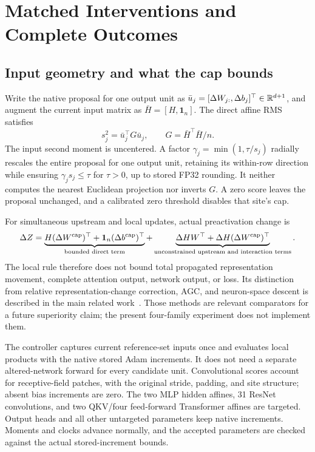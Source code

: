 \clearpage
\section{Matched Interventions and Complete Outcomes}

\subsection{Input geometry and what the cap bounds}
Write the native proposal for one output unit as $\bar u_j=[\Delta W_{j:},\Delta b_j]^\top\in\mathbb{R}^{d+1}$, and augment the current input matrix as $\bar H=[H,\mathbf1_n]$. The direct affine RMS satisfies
\begin{equation}
 s_j^2=\bar u_j^\top G\bar u_j,\qquad G=\bar H^\top\bar H/n.
\end{equation}
The input second moment is uncentered. A factor $\gamma_j=\min(1,\tau/s_j)$ radially rescales the entire proposal for one output unit, retaining its within-row direction while ensuring $\gamma_js_j\leq\tau$ for $\tau>0$, up to stored FP32 rounding. It neither computes the nearest Euclidean projection nor inverts $G$. A zero score leaves the proposal unchanged, and a calibrated zero threshold disables that site's cap.

For simultaneous upstream and local updates, actual preactivation change is
\begin{equation}
 \Delta Z=
 \underbrace{H(\Delta W^{\rm cap})^\top+\mathbf1_n(\Delta b^{\rm cap})^\top}_{\text{bounded direct term}}
 +\underbrace{\Delta H W^\top+\Delta H(\Delta W^{\rm cap})^\top}_{\text{unconstrained upstream and interaction terms}}.
\end{equation}
The local rule therefore does not bound total propagated representation movement, complete attention output, network output, or loss. Its distinction from relative representation-change correction, AGC, and neuron-space descent is described in the main related work~\cite{kosson2024warmup,brock2021normalization,benzing2022neurons}. Those methods are relevant comparators for a future superiority claim; the present four-family experiment does not implement them.

The controller captures current reference-set inputs once and evaluates local products with the native stored Adam increments. It does not need a separate altered-network forward for every candidate unit. Convolutional scores account for receptive-field patches, with the original stride, padding, and site structure; absent bias increments are zero. The two MLP hidden affines, 31 ResNet convolutions, and two QKV/four feed-forward Transformer affines are targeted. Output heads and all other untargeted parameters keep native increments. Moments and clocks advance normally, and the accepted parameters are checked against the actual stored-increment bounds.

